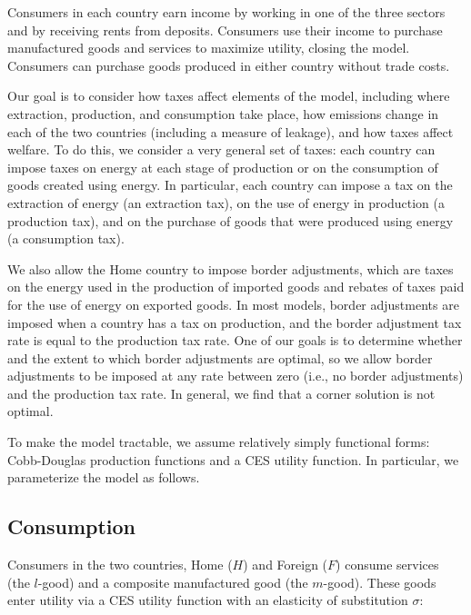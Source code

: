 \documentclass[notitlepage,12pt]{article}
\begin{document}
Consumers in each country earn income by working in one of the three sectors
and by receiving rents from deposits. Consumers use their income to purchase
manufactured goods and services to maximize utility, closing the model.
Consumers can purchase goods produced in either country without trade costs. 

Our goal is to consider how taxes affect elements of the model, including
where extraction, production, and consumption take place, how emissions
change in each of the two countries (including a measure of leakage), and
how taxes affect welfare. To do this, we consider a very general set of
taxes: each country can impose taxes on energy at each stage of production
or on the consumption of goods created using energy. In particular, each
country can impose a tax on the extraction of energy (an extraction tax), on
the use of energy in production (a production tax), and on the purchase of
goods that were produced using energy (a consumption tax).

We also allow the Home country to impose border adjustments, which are taxes
on the energy used in the production of imported goods and rebates of taxes
paid for the use of energy on exported goods. In most models, border
adjustments are imposed when a country has a tax on production, and the
border adjustment tax rate is equal to the production tax rate. One of our
goals is to determine whether and the extent to which border adjustments are
optimal, so we allow border adjustments to be imposed at any rate between
zero (i.e., no border adjustments) and the production tax rate. In general,
we find that a corner solution is not optimal.

To make the model tractable, we assume relatively simply functional forms:
Cobb-Douglas production functions and a CES utility function. In particular,
we parameterize the model as follows.

\subsection{Consumption}

Consumers in the two countries, Home ($H$) and Foreign ($F$) consume
services (the $l$-good) and a composite manufactured good (the $m$-good).
These goods enter utility via a CES utility function with an elasticity of
substitution $\sigma $:
\end{document}
